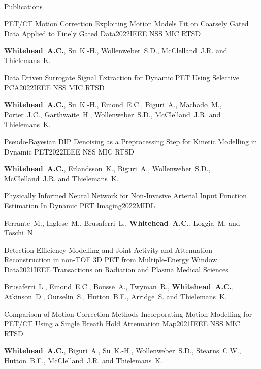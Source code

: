 \documentclass{cv}
\begin{document}
\begin{rSection}{Publications}
        \begin{rSubsection}{PET/CT Motion Correction Exploiting Motion Models Fit on Coarsely Gated Data Applied to Finely Gated Data}{2022}{IEEE NSS MIC RTSD}{}
            \item {\bf Whitehead~A.C.}, Su~K.-H., Wollenweber~S.D., McClelland~J.R. and Thielemans~K.
        \end{rSubsection}
        
        \begin{rSubsection}{Data Driven Surrogate Signal Extraction for Dynamic PET Using Selective PCA}{2022}{IEEE NSS MIC RTSD}{}
            \item {\bf Whitehead~A.C.}, Su~K.-H., Emond~E.C., Biguri~A., Machado~M., Porter~J.C., Garthwaite~H., Wollenweber~S.D., McClelland~J.R. and Thielemans~K.
        \end{rSubsection}
        
        \begin{rSubsection}{Pseudo-Bayesian DIP Denoising as a Preprocessing Step for Kinetic Modelling in Dynamic \newline PET}{2022}{IEEE NSS MIC RTSD}{}
            \item {\bf Whitehead~A.C.}, Erlandsson~K., Biguri~A., Wollenweber~S.D., McClelland~J.R. and Thielemans~K.
        \end{rSubsection}
        
        \begin{rSubsection}{Physically Informed Neural Network for Non-Invasive Arterial Input Function Estimation In Dynamic PET Imaging}{2022}{MIDL}{}
            \item Ferrante~M., Inglese~M., Brusaferri~L., {\bf Whitehead~A.C.}, Loggia~M. and Toschi~N.
        \end{rSubsection}
        
        \begin{rSubsection}{Detection Efficiency Modelling and Joint Activity and Attenuation Reconstruction in non-TOF 3D PET from Multiple-Energy Window Data}{2021}{IEEE Transactions on Radiation and Plasma Medical Sciences}{}
            \item Brusaferri~L., Emond~E.C., Bousse~A., Twyman~R., {\bf Whitehead~A.C.}, Atkinson~D., Ourselin~S., Hutton~B.F., Arridge~S. and Thielemans~K.
        \end{rSubsection}
        
        \begin{rSubsection}{Comparison of Motion Correction Methods Incorporating Motion Modelling for PET/CT Using a Single Breath Hold Attenuation Map}{2021}{IEEE NSS MIC RTSD}{}
            \item {\bf Whitehead~A.C.}, Biguri~A., Su~K.-H., Wollenweber~S.D., Stearns~C.W., Hutton~B.F., McClelland~J.R. and Thielemans~K.
        \end{rSubsection}
        

\end{rSection}
\end{document}
